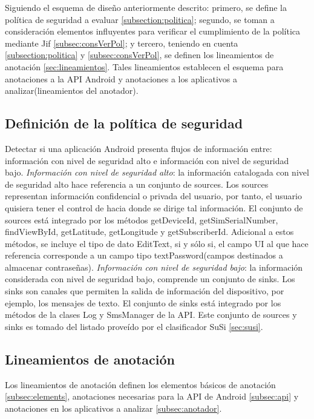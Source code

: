 Siguiendo el esquema de diseño anteriormente descrito: primero, se define la
política de seguridad a evaluar \ref{subsection:politica}; segundo, se toman a
consideración elementos influyentes para verificar el cumplimiento de la
política mediante Jif \ref{subsec:consVerPol}; y tercero, teniendo en cuenta
\ref{subsection:politica} y \ref{subsec:consVerPol}, se definen los lineamientos
de anotación \ref{sec:lineamientos}. Tales lineamientos establecen el esquema
para anotaciones a la API Android y anotaciones a los aplicativos a
analizar(lineamientos del anotador).

\subsection{Definición de la política de seguridad}
\label{sub:politica}
Detectar si una aplicación Android presenta flujos de información entre:
información con nivel de seguridad alto e información con nivel de seguridad bajo.\newline
\textit{Información con nivel de seguridad alto}: la información
catalogada con nivel de seguridad alto hace referencia a un conjunto de sources.
Los sources representan información confidencial o privada del usuario, por
tanto, el usuario quisiera tener el control de hacia donde se dirige tal
información.
El conjunto de sources está integrado por los métodos getDeviceId,
getSimSerialNumber, findViewById, getLatitude, getLongitude y getSubscriberId.
Adicional a estos métodos, se incluye el tipo de dato EditText, si y sólo si, el
campo UI al que hace referencia corresponde a un campo tipo textPassword(campos
destinados a almacenar contraseñas).\newline 
\textit{Información con nivel de seguridad bajo}: la
información considerada con nivel de seguridad bajo, comprende un conjunto
de sinks. Los sinks son canales que permiten la salida de información del
dispositivo, por ejemplo, los mensajes de texto. El conjunto de sinks
está integrado por los métodos de la clases Log y SmsManager de la API.\newline
Este conjunto de sources y sinks es tomado del listado proveído por el
clasificador SuSi \ref{sec:susi}.

\subsection{Lineamientos de anotación}
\label{sub:lineamientos}
Los lineamientos de anotación definen los elementos básicos de anotación
\ref{subsec:elements}, anotaciones necesarias para la API de Android
\ref{subsec:api} y anotaciones en los aplicativos a analizar \ref{subsec:anotador}.

